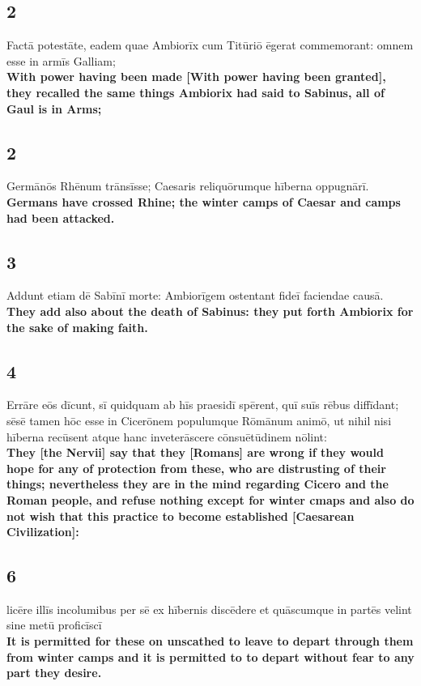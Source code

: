 \documentclass{article}
\begin{document}
\subsection*{2}
Factā potestāte, eadem quae Ambiorīx cum Titūriō ēgerat commemorant: omnem esse in armīs Galliam;\\
\textbf{With power having been made [With power having been granted], they recalled the same things Ambiorix had said to Sabinus, all of Gaul is in Arms; }

\subsection*{2}
Germānōs Rhēnum trānsīsse; Caesaris reliquōrumque hīberna oppugnārī.\\
\textbf{Germans have crossed Rhine; the winter camps of Caesar and camps had been attacked.}

\subsection*{3}
Addunt etiam dē Sabīnī morte: Ambiorīgem ostentant fideī faciendae causā.\\
\textbf{They add also about the death of Sabinus: they put forth Ambiorix for the sake of making faith.}

\subsection*{4}
Errāre eōs dīcunt, sī quidquam ab hīs praesidī spērent, quī suīs rēbus diffīdant; sēsē tamen hōc esse in Cicerōnem populumque Rōmānum animō, ut nihil nisi hīberna recūsent atque hanc inveterāscere cōnsuētūdinem nōlint:\\
\textbf{They [the Nervii] say that they [Romans] are wrong if they would hope for any of protection from these, who are distrusting of their things; nevertheless they are in the mind regarding Cicero and the Roman people, and refuse nothing except for winter cmaps and also do not wish that this practice to become established [Caesarean Civilization]:}

\subsection*{6}
licēre illīs incolumibus per sē ex hībernis discēdere et quāscumque in partēs velint sine metū proficīscī\\
\textbf{It is permitted for these on unscathed to leave to depart through them from winter camps and it is permitted to to depart without fear to any part they desire.}
\end{document}

